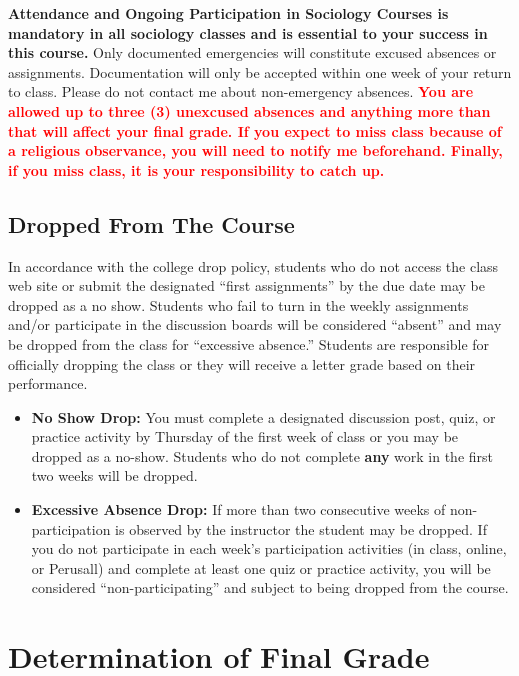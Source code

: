 \documentclass[11pt,]{article}
\begin{document}
\textbf{Attendance and Ongoing Participation in Sociology Courses is
mandatory in all sociology classes and is essential to your success in
this course.} Only documented emergencies will constitute excused
absences or assignments. Documentation will only be accepted within one
week of your return to class. Please do not contact me about
non-emergency absences.
\textcolor{red}{\bf{You are allowed up to three (3) unexcused absences and anything more than that will affect your final grade. If you expect to miss class because of a religious observance, you will need to notify me beforehand. Finally, if you miss class, it is your responsibility to catch up.}}

\hypertarget{dropped-from-the-course}{%
\subsection{Dropped From The Course}\label{dropped-from-the-course}}

In accordance with the college drop policy, students who do not access
the class web site or submit the designated ``first assignments'' by the
due date may be dropped as a no show. Students who fail to turn in the
weekly assignments and/or participate in the discussion boards will be
considered ``absent'' and may be dropped from the class for ``excessive
absence.'' Students are responsible for officially dropping the class or
they will receive a letter grade based on their performance.

\begin{itemize}
\item
  \textbf{No Show Drop:} You must complete a designated discussion post,
  quiz, or practice activity by Thursday of the first week of class or
  you may be dropped as a no-show. Students who do not complete
  \textbf{any} work in the first two weeks will be dropped.
\item
  \textbf{Excessive Absence Drop:} If more than two consecutive weeks of
  non-participation is observed by the instructor the student may be
  dropped. If you do not participate in each week's participation
  activities (in class, online, or Perusall) and complete at least one
  quiz or practice activity, you will be considered
  ``non-participating'' and subject to being dropped from the course.
\end{itemize}

\hypertarget{determination-of-final-grade}{%
\section{Determination of Final
Grade}\label{determination-of-final-grade}}
\end{document}

